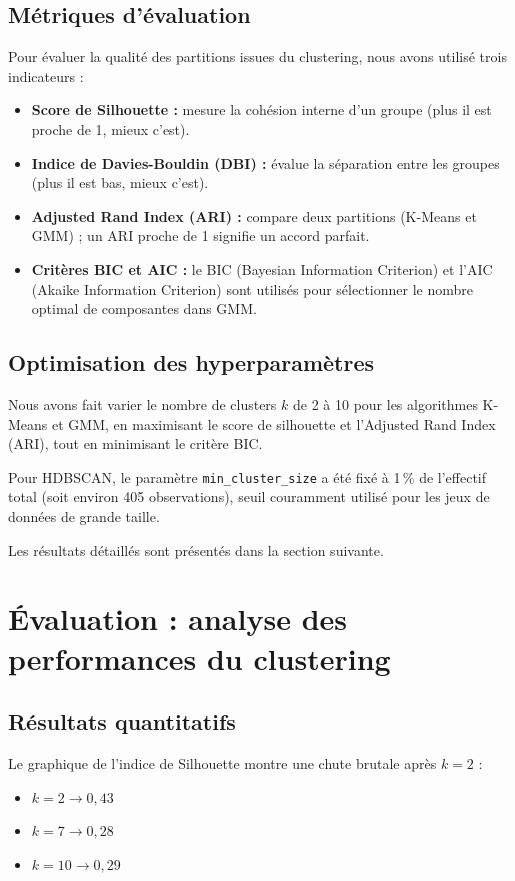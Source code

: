 \subsection{Métriques d’évaluation}

Pour évaluer la qualité des partitions issues du clustering, nous avons utilisé trois indicateurs :

\begin{itemize}
    \item \textbf{Score de Silhouette :} mesure la cohésion interne d’un groupe (plus il est proche de 1, mieux c’est).
    
    \item \textbf{Indice de Davies-Bouldin (DBI) :} évalue la séparation entre les groupes (plus il est bas, mieux c’est).
    
    \item \textbf{Adjusted Rand Index (ARI) :} compare deux partitions (K-Means et GMM) ; un ARI proche de 1 signifie un accord parfait.
    
    \item \textbf{Critères BIC et AIC :} le BIC (Bayesian Information Criterion) et l’AIC (Akaike Information Criterion) sont utilisés pour sélectionner le nombre optimal de composantes dans GMM.\cite{ashari2023analysis}
\end{itemize}
\subsection{Optimisation des hyperparamètres}
Nous avons fait varier le nombre de clusters $k$ de 2 à 10 pour les algorithmes K-Means et GMM, en maximisant le score de silhouette et l’Adjusted Rand Index (ARI), tout en minimisant le critère BIC.

Pour HDBSCAN, le paramètre \texttt{min\_cluster\_size} a été fixé à 1\,\% de l’effectif total (soit environ 405 observations), seuil couramment utilisé pour les jeux de données de grande taille.

Les résultats détaillés sont présentés dans la section suivante.\cite{hdbscan_docs_api}
\section{Évaluation : analyse des performances du clustering}
\subsection{Résultats quantitatifs}
Le graphique de l’indice de Silhouette montre une chute brutale après $k = 2$ :
\begin{itemize}
    \item $k = 2 \rightarrow 0{,}43$
    \item $k = 7 \rightarrow 0{,}28$
    \item $k = 10 \rightarrow 0{,}29$
\end{itemize}

